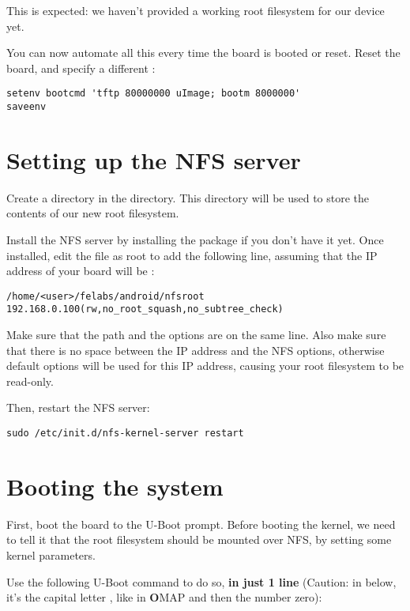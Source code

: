 This is expected: we haven't provided a working root filesystem for
our device yet.

You can now automate all this every time the board is booted or
reset. Reset the board, and specify a different :

\begin{verbatim}
setenv bootcmd 'tftp 80000000 uImage; bootm 8000000'
saveenv
\end{verbatim}

\section{Setting up the NFS server}

Create a  directory in the 
directory. This  directory will be used to store the
contents of our new root filesystem.

Install the NFS server by installing the 
package if you don't have it yet. Once installed, edit the
 file as root to add the following line, assuming that the
IP address of your board will be :

\footnotesize
\begin{verbatim}
/home/<user>/felabs/android/nfsroot 192.168.0.100(rw,no_root_squash,no_subtree_check)
\end{verbatim}
\normalsize

Make sure that the path and the options are on the same line.
Also make sure that there is no space between the IP address and the NFS
options, otherwise default options will be used for this IP address,
causing your root filesystem to be read-only.

Then, restart the NFS server:

\begin{verbatim}
sudo /etc/init.d/nfs-kernel-server restart
\end{verbatim}

\section{Booting the system}

First, boot the board to the U-Boot prompt. Before booting the kernel,
we need to tell it that the root filesystem should be mounted over
NFS, by setting some kernel parameters.

Use the following U-Boot command to do so, {\bf in just 1 line}
(Caution: in  below, it's the capital letter , like in
{\bf O}MAP and then the number zero):

